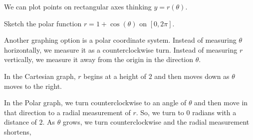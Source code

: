 \documentclass{ximera}
\begin{document}
We can plot points on rectangular axes thinking $y = r(\theta)$. 





\begin{example}
  Sketch the polar function $r=1+\cos(\theta)$ on $[0,2\pi]$.

    \begin{image}%
      \end{image}
\end{example}


Another graphing option is a polar coordinate system.  Instead of measuring $\theta$ horizontally, we measure it as a counterclockwise turn.  Instead of measuring $r$ vertically, we measure it away from the origin in the direction $\theta$.

In the Cartesian graph, $r$ begins at a height of $2$ and then moves down as $\theta$ moves to the right.

In the Polar graph, we turn counterclockwise to an angle of $\theta$ and then move in that direction to a radial measurement of $r$. So, we turn to $0$ radians with a distance of $2$.  As $\theta$ grows, we turn counterclockwise and the radial measurement shortens,

\begin{image}
\end{image}
\end{document}
